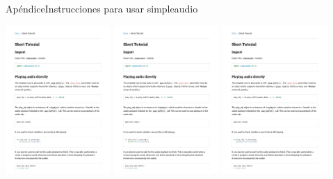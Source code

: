 \begin{frame}[c]{Apéndice}{Instrucciones para usar simpleaudio}
   \begin{center}
      \includegraphics[page=3,width=0.3\textwidth]{2_clase/simpleaudio_tutorial}
      \includegraphics[page=4,width=0.3\textwidth]{2_clase/simpleaudio_tutorial}
      \includegraphics[page=5,width=0.3\textwidth]{2_clase/simpleaudio_tutorial}
   \end{center}
\end{frame}
